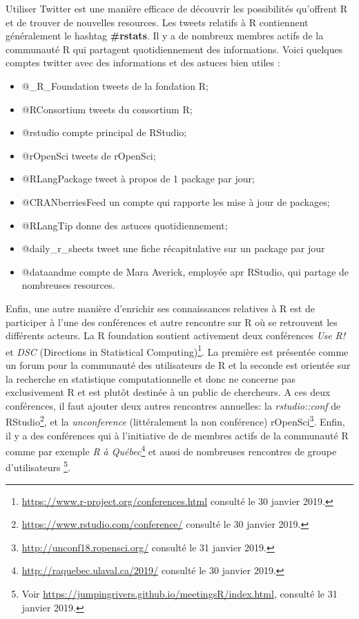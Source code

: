 \documentclass[]{article}
\providecommand{\tightlist}{%
  \setlength{\itemsep}{0pt}\setlength{\parskip}{0pt}}
\begin{document}
Utiliser Twitter est une manière efficace de découvrir les possibilités qu'offrent R et de trouver de nouvelles resources. Les tweets relatifs à R contiennent généralement le hashtag \textbf{\#rstats}. Il y a de nombreux membres actifs de la communauté R qui partagent quotidiennement des informations. Voici quelques comptes twitter avec des informations et des astuces bien utiles :

\begin{itemize}
\tightlist
\item
  @\_R\_Foundation tweets de la fondation R;
\item
  @RConsortium tweets du consortium R;
\item
  @rstudio compte principal de RStudio;
\item
  @rOpenSci tweets de rOpenSci;
\item
  @RLangPackage tweet à propos de 1 package par jour;
\item
  @CRANberriesFeed un compte qui rapporte les mise à jour de packages;
\item
  @RLangTip donne des astuces quotidiennement;
\item
  @daily\_r\_sheets tweet une fiche récapitulative sur un package par jour
\item
  @dataandme compte de Mara Averick, employée apr RStudio, qui partage de nombreuses resources.
\end{itemize}

Enfin, une autre manière d'enrichir ses connaissances relatives à R est de participer à l'une des conférences et autre rencontre sur R où se retrouvent les différents acteurs. La R foundation soutient activement deux conférences \emph{Use R!} et \emph{DSC} (Directions in Statistical Computing)\footnote{\url{https://www.r-project.org/conferences.html} consulté le 30 janvier 2019.}. La première est présentée comme un forum pour la communauté des utilisateurs de R et la seconde est orientée sur la recherche en statistique computationnelle et donc ne concerne pas exclusivement R et est plutôt destinée à un public de chercheurs. A ces deux conférences, il faut ajouter deux autres rencontres annuelles: la \emph{rstudio::conf} de RStudio\footnote{\url{https://www.rstudio.com/conference/} consulté le 30 janvier 2019.}, et la \emph{unconference} (littéralement la non conférence) rOpenSci\footnote{\url{http://unconf18.ropensci.org/} consulté le 31 janvier 2019.}. Enfin, il y a des conférences qui à l'initiative de de membres actifs de la communauté R comme par exemple \emph{R à Québec}\footnote{\url{http://raquebec.ulaval.ca/2019/} consulté le 30 janvier 2019.} et aussi de nombreuses rencontres de groupe d'utilisateurs \footnote{Voir \url{https://jumpingrivers.github.io/meetingsR/index.html}, consulté le 31 janvier 2019.}.
\end{document}
